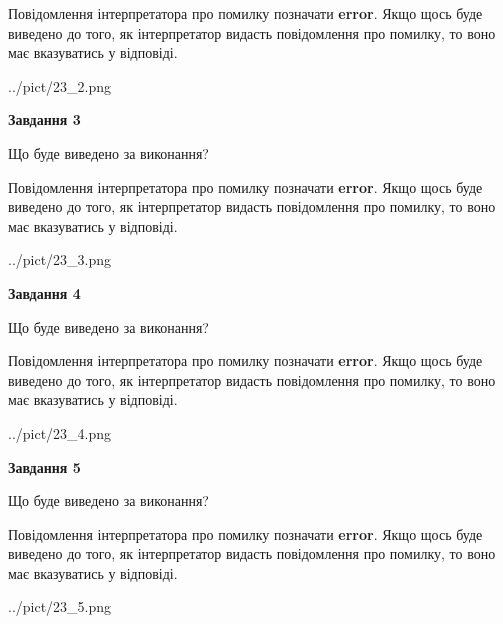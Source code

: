 \documentclass[12pt, ukrainian]{article}
\begin{document}
{\begin {large}
Повідомлення інтерпретатора про помилку позначати \textbf{error}.
Якщо щось буде виведено до того, як інтерпретатор видасть повідомлення про помилку, 
то воно має вказуватись у відповіді. \par


\begin{center}
	{../pict/23_2.png}
\end{center}
\newpage

{\begin {center}\textbf{Завдання 3}\end {center}}\par
Що буде виведено за виконання?

Повідомлення інтерпретатора про помилку позначати \textbf{error}.
Якщо щось буде виведено до того, як інтерпретатор видасть повідомлення про помилку, 
то воно має вказуватись у відповіді. \par


\begin{center}
	{../pict/23_3.png}
\end{center}
\newpage

{\begin {center}\textbf{Завдання 4}\end {center}}\par
Що буде виведено за виконання?

Повідомлення інтерпретатора про помилку позначати \textbf{error}.
Якщо щось буде виведено до того, як інтерпретатор видасть повідомлення про помилку, 
то воно має вказуватись у відповіді. \par


\begin{center}
	{../pict/23_4.png}
\end{center}
\newpage

{\begin {center}\textbf{Завдання 5}\end {center}}\par
Що буде виведено за виконання?

Повідомлення інтерпретатора про помилку позначати \textbf{error}.
Якщо щось буде виведено до того, як інтерпретатор видасть повідомлення про помилку, 
то воно має вказуватись у відповіді. \par


\begin{center}
	{../pict/23_5.png}
\end{center}
\newpage


\end{large}}
\end{document}
